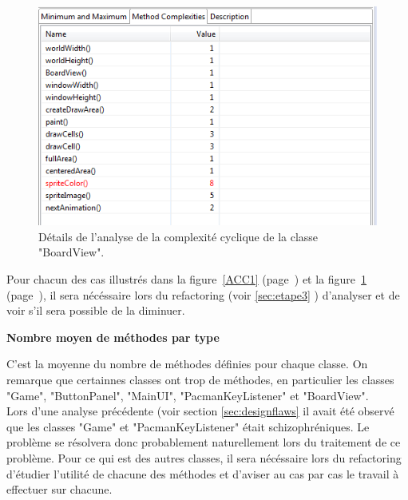 \documentclass[12pt,a4paper,final]{article}
\newcommand{\smalltitle}[1]{\bigskip\large\textbf{#1}\par\normalsize\medskip}
\newcommand{\labelfigure}[1]{figure~\ref{#1} (page~\pageref{#1})}
\begin{document}
\begin{figure}[!h]
	\centering
	\includegraphics[width=\textwidth]{ACC_BoardView.png}
	\caption{\label{ACC2}Détails de l'analyse de la complexité cyclique de la classe "BoardView".}
\end{figure}
Pour chacun des cas illustrés dans la \labelfigure{ACC1} et la \labelfigure{ACC2}, il sera nécéssaire lors du refactoring (voir \ref{sec:etape3} ) d'analyser et de voir s'il sera possible de la diminuer.


\smalltitle{Nombre moyen de méthodes par type}
C'est la moyenne du nombre de méthodes définies pour chaque classe.
On remarque que certainnes classes ont trop de méthodes, en particulier les classes "Game", "ButtonPanel", "MainUI", "PacmanKeyListener" et "BoardView". \\
Lors d'une analyse précédente (voir section \ref{sec:designflaws} il avait été observé que les classes "Game" et "PacmanKeyListener" était schizophréniques. Le problème se résolvera donc probablement naturellement lors du traitement de ce problème. Pour ce qui est des autres classes, il sera nécéssaire lors du refactoring d'étudier l'utilité de chacune des méthodes et d'aviser au cas par cas le travail à effectuer sur chacune.


\clearpage
\end{document}
